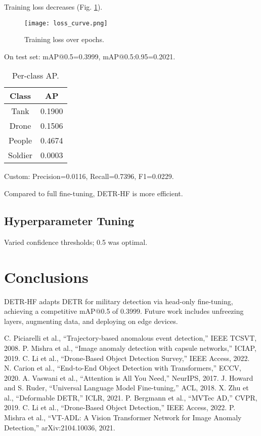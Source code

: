\documentclass[12pt]{article}
\begin{document}
Training loss decreases (Fig. \ref{fig:loss}).

\begin{figure}[h]
    \centering
    \texttt{[image: loss\_curve.png]}
    \caption{Training loss over epochs.}
    \label{fig:loss}
\end{figure}

On test set: mAP@0.5=0.3999, mAP@0.5:0.95=0.2021.

\begin{table}[h]
    \centering
    \begin{tabular}{|c|c|}
        \hline
        Class & AP \\
        \hline
        Tank & 0.1900 \\
        Drone & 0.1506 \\
        People & 0.4674 \\
        Soldier & 0.0003 \\
        \hline
    \end{tabular}
    \caption{Per-class AP.}
    \label{tab:ap}
\end{table}

Custom: Precision=0.0116, Recall=0.7396, F1=0.0229.

Compared to full fine-tuning, DETR-HF is more efficient.

\subsection{Hyperparameter Tuning}

Varied confidence thresholds; 0.5 was optimal.

\section{Conclusions}

DETR-HF adapts DETR for military detection via head-only fine-tuning, achieving a competitive mAP@0.5 of 0.3999. Future work includes unfreezing layers, augmenting data, and deploying on edge devices.

\begin{thebibliography}{9}
     C. Piciarelli et al., “Trajectory-based anomalous event detection,” IEEE TCSVT, 2008.
     P. Mishra et al., “Image anomaly detection with capsule networks,” ICIAP, 2019.
     C. Li et al., “Drone-Based Object Detection Survey,” IEEE Access, 2022.
     N. Carion et al., “End-to-End Object Detection with Transformers,” ECCV, 2020.
     A. Vaswani et al., “Attention is All You Need,” NeurIPS, 2017.
     J. Howard and S. Ruder, “Universal Language Model Fine-tuning,” ACL, 2018.
     X. Zhu et al., “Deformable DETR,” ICLR, 2021.
     P. Bergmann et al., “MVTec AD,” CVPR, 2019.
     C. Li et al., “Drone-Based Object Detection,” IEEE Access, 2022.
     P. Mishra et al., “VT-ADL: A Vision Transformer Network for Image Anomaly Detection,” arXiv:2104.10036, 2021.
\end{thebibliography}
\end{document}

